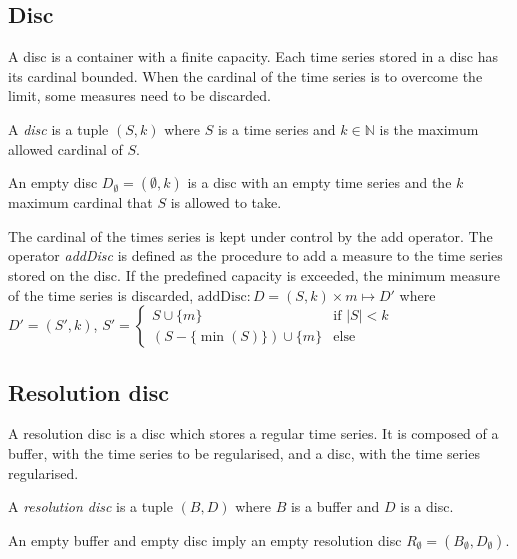 \subsection{Disc}\label{sec:model:disc}

A disc is a container with a finite capacity. Each time series stored
in a disc has its cardinal bounded. When the cardinal of the time
series is to overcome the limit, some measures need to be discarded.

\begin{definition}[Disc]
  A \emph{disc} is a tuple $(S,k)$ where $S$ is a time
  series and $k\in\mathbb{N}$ is the maximum allowed cardinal of $S$.
\end{definition}

An empty disc $D_{\emptyset} = (\emptyset,k)$ is a disc with an empty
time series and the $k$ maximum cardinal that $S$ is allowed to take.

The cardinal of the times series is kept under control by the add
operator.  The operator \emph{addDisc} is defined as the procedure to
add a measure to the time series stored on the disc. If the predefined
capacity is exceeded, the minimum measure of the time series is
discarded, $\text{addDisc}: D=(S,k) \times m \mapsto D'$ where $ D' =
(S',k)$, $ S' =
  \begin{cases}
      S\cup\{m\} &\text{if }  |S|<k\\
      (S-\{\min(S)\}) \cup \{m\} & \text{else }
    \end{cases}  
    $



\subsection{Resolution disc}

A resolution disc is a disc which stores a regular time series. It is
composed of a buffer, with the time series to be regularised, and a
disc, with the time series regularised.

\begin{definition}
  A \emph{resolution disc} is a tuple $(B,D)$ where $B$
  is a buffer and $D$ is a disc.
\end{definition}
 
An empty buffer and empty disc imply an empty resolution disc
$R_{\emptyset} = (B_{\emptyset},D_{\emptyset})$.

